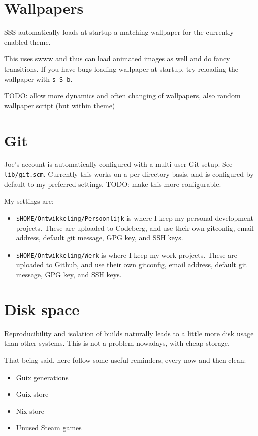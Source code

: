 \documentclass[11pt]{article}
\begin{document}
\section{Wallpapers}
\label{sec:orgeabd2eb}

SSS automatically loads at startup a matching wallpaper for the currently enabled theme.

This uses swww and thus can load animated images as well and do fancy transitions. If you have bugs loading wallpaper at startup, try reloading the wallpaper with \texttt{s-S-b}.

TODO: allow more dynamics and often changing of wallpapers, also random wallpaper script (but within theme)

\section{Git}
\label{sec:org65cdaec}

Joe's account is automatically configured with a multi-user Git setup. See \texttt{lib/git.scm}.
Currently this works on a per-directory basis, and is configured by default to my preferred settings.
TODO: make this more configurable.

My settings are:
\begin{itemize}
\item \texttt{\$HOME/Ontwikkeling/Persoonlijk} is where I keep my personal development projects. These are uploaded to Codeberg, and use their own gitconfig, email address, default git message, GPG key, and SSH keys.
\item \texttt{\$HOME/Ontwikkeling/Werk} is where I keep my work projects. These are uploaded to Github, and use their own gitconfig, email address, default git message, GPG key, and SSH keys.
\end{itemize}

\section{Disk space}
\label{sec:org7e0ce53}

Reproducibility and isolation of builds naturally leads to a little more disk usage than other systems. This is not a problem nowadays, with cheap storage.

That being said, here follow some useful reminders, every now and then clean:
\begin{itemize}
\item Guix generations
\item Guix store
\item Nix store
\item Unused Steam games
\end{itemize}
\end{document}
